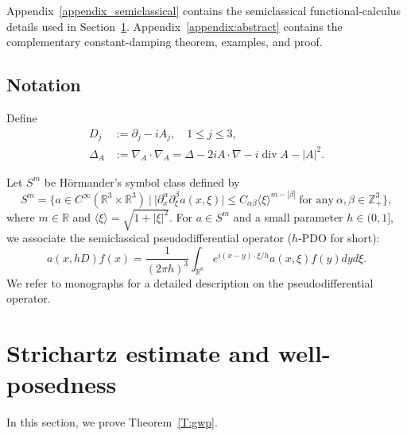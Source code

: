 \documentclass[10pt%
]{amsart}
\numberwithin{equation}{section}
\newcommand{\pa}{\partial}
\newcommand{\R}{\mathbb{R}}
\newcommand{\Z}{\mathbb{Z}}
\theoremstyle{definition}
\def\<{{\langle}}
\def\>{{\rangle}}
\def\div{\mathop{\mathrm{div}}\nolimits}
\begin{document}
Appendix~\ref{appendix_semiclassical} contains the semiclassical functional-calculus details used in Section~\ref{sec:Striwellpod}. Appendix~\ref{appendix:abstract} contains the complementary constant-damping theorem, examples, and proof.

\subsection{Notation}
\label{section_notation}
Define
\begin{align*}%
	D_j&:=\pa_j-iA_j,\quad 1\leq j\leq3,\\%
	\Delta_A&:=\nabla_A\cdot\nabla_A=\Delta-2iA\cdot\nabla-i\div A-|A|^2.
\end{align*}

Let $S^m$ be H\"ormander's symbol class defined by
$$
S^m=\{a\in C^\infty(\R^3\times \R^3)\ |\ |\partial_x^\alpha\partial_\xi^\beta a(x,\xi)|\le C_{\alpha\beta}\langle\xi\rangle^{m-|\beta|}\ \text{for any}\ \alpha,\beta\in \Z_+^3\},
$$
where $m\in \R$ and $\<\xi\>=\sqrt{1+|\xi|^2}$. For $a\in S^m$ and a small parameter $h\in (0,1]$, we associate the semiclassical pseudodifferential operator ($h$-PDO for short): 
$$
a(x,hD)f(x)=\frac{1}{(2\pi h)^3}\int_{\R^6}e^{i(x-y)\cdot\xi/h} a(x,\xi)f(y)dyd\xi.
$$
We refer to monographs \cite{Hormander,DiSj,Stein} for a detailed description on the pseudodifferential operator. 






\section{Strichartz estimate and well-posedness}\label{sec:Striwellpod}

In this section, we prove Theorem~\ref{T:gwp}.
\end{document}
